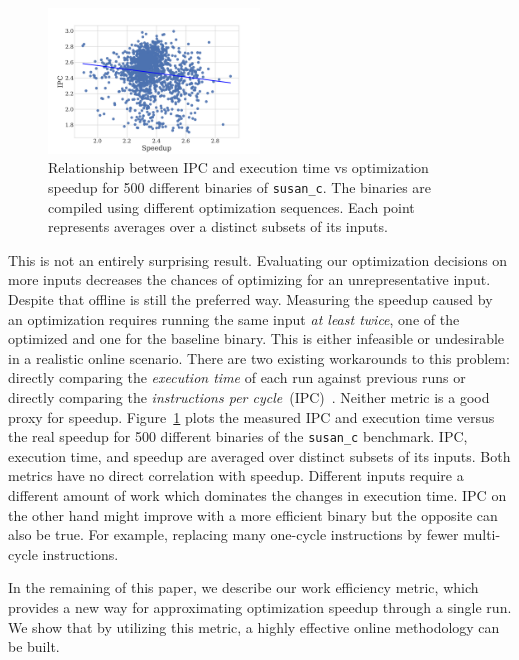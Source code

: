 \begin{figure}[t]
    \centering
    \includegraphics[width=0.5\textwidth]{figs/motivation-metric.pdf}
    \caption{Relationship between IPC and execution time vs optimization speedup for 500 different binaries of \texttt{susan\_c}. The binaries are compiled using different optimization sequences. Each point represents
	averages over a distinct subsets of its inputs.}
    \label{fig:motivation-metric}
\end{figure}

This is not an entirely surprising result. Evaluating our optimization decisions on more inputs decreases the chances of optimizing for an
unrepresentative input. Despite that offline \itercomp is still the preferred way. Measuring the speedup caused by an optimization requires
running the same input \textit{at least twice}, one of the optimized and one for the baseline binary. This is either infeasible or
undesirable in a realistic online \itercomp scenario. There are two existing workarounds to this problem: directly comparing the
\textit{execution time} of each run against previous runs or directly comparing the \textit{instructions per cycle}~(IPC)~\citep{fursin07}.
Neither metric is a good proxy for speedup. Figure~\ref{fig:motivation-metric} plots the measured IPC and execution time versus the real
speedup for 500 different binaries of the \texttt{susan\_c} benchmark. IPC, execution time, and speedup are averaged over distinct subsets of its inputs.
Both metrics have no direct correlation with speedup. Different inputs require a different amount of work which dominates the changes in execution time. IPC on
the other hand might improve with a more efficient binary but the opposite can also be true. For example,
replacing many one-cycle instructions by fewer multi-cycle instructions.

In the remaining of this paper, we describe our work efficiency metric, which provides a new way for approximating optimization speedup
through a single run. We show that by utilizing this metric, a highly effective online \itercomp methodology can be built.

